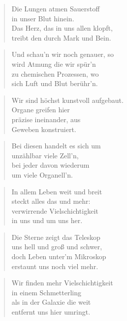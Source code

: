 \documentclass[10pt,a4paper]{article}
\begin{document}
\begin{multicols}{2}
\begin{verse}
Die Lungen atmen Sauerstoff \\
in unser Blut hinein. \\
Das Herz, das in uns allen klopft, \\
treibt den durch Mark und Bein. \\
\end{verse}

\begin{verse}
Und schau’n wir noch genauer, so \\
wird Atmung die wir spür’n \\
zu chemischen Prozessen, wo \\
sich Luft und Blut berühr’n. \\
\end{verse}

\begin{verse}
Wir sind höchst kunstvoll aufgebaut. \\
Organe greifen hier \\
präzise ineinander, aus \\
Geweben konstruiert. \\
\end{verse}

\begin{verse}
Bei diesen handelt es sich um \\
unzählbar viele Zell’n, \\
bei jeder davon wiederum \\
um viele Organell’n. \\
\end{verse}

\begin{verse}
In allem Leben weit und breit \\
steckt alles das und mehr: \\
verwirrende Vielschichtigkeit \\
in uns und um uns her. \\
\end{verse}

\begin{verse}
Die Sterne zeigt das Teleskop \\
uns hell und groß und schwer, \\
doch Leben unter’m Mikroskop \\
erstaunt uns noch viel mehr. \\
\end{verse}

\begin{verse}
Wir finden mehr Vielschichtigkeit \\
in einem Schmetterling \\
als in der Galaxie die weit \\
entfernt uns hier umringt. \\
\end{verse}


\end{multicols}
\end{document}
